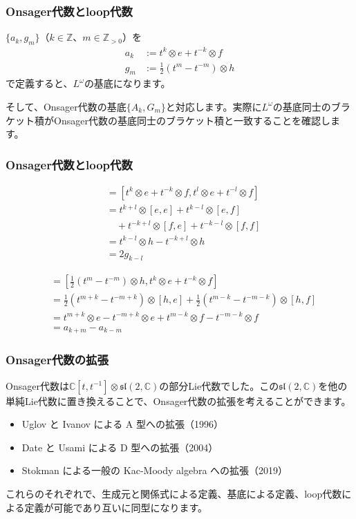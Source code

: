 \documentclass{beamer}
\begin{document}
\begin{frame}
    \frametitle{Onsager代数とloop代数}

    $\{a_k,g_m\}$（$k∈ℤ$、$m∈ℤ_{>0}$）を
    \begin{align}
        a_k & :=t^k⊗e+t^{-k}⊗f            \\
        g_m & :=\frac{1}{2}(t^m-t^{-m})⊗h
    \end{align}
    で定義すると、$L^ω$の基底になります。

    \bigskip

    そして、Onsager代数の基底$\{A_k,G_m\}$と対応します。実際に$L^ω$の基底同士のブラケット積がOnsager代数の基底同士のブラケット積と一致することを確認します。
\end{frame}

\begin{frame}
    \frametitle{Onsager代数とloop代数}

    \begin{align}
        [a_k,a_l] & = [t^k⊗e+t^{-k}⊗f,t^l⊗e+t^{-l}⊗f]    \\
                  & = t^{k+l}⊗[e,e]+t^{k-l}⊗[e,f]        \\
                  & \quad +t^{-k+l}⊗[f,e]+t^{-k-l}⊗[f,f] \\
                  & = t^{k-l}⊗h-t^{-k+l}⊗h               \\
                  & = 2g_{k-l}
    \end{align}

    \begin{align}
        [g_m,a_k] & = \left[\frac{1}{2}(t^m-t^{-m})⊗h,t^k⊗e+t^{-k}⊗f\right]                   \\
                  & = \frac{1}{2}(t^{m+k}-t^{-m+k})⊗[h,e]+\frac{1}{2}(t^{m-k}-t^{-m-k})⊗[h,f] \\
                  & = t^{m+k}⊗e-t^{-m+k}⊗e+t^{m-k}⊗f-t^{-m-k}⊗f                               \\
                  & = a_{k+m}-a_{k-m}
    \end{align}
\end{frame}

\begin{frame}
    \frametitle{Onsager代数の拡張}

    Onsager代数は$ℂ[t,t^{-1}]⊗\mathfrak{sl}(2,ℂ)$の部分Lie代数でした。この$\mathfrak{sl}(2,ℂ)$を他の単純Lie代数に置き換えることで、Onsager代数の拡張を考えることができます。

    \bigskip

    \begin{itemize}
        \item Uglov と Ivanov による A 型への拡張（1996）
        \item Date と Usami による D 型への拡張（2004）
        \item Stokman による一般の Kac-Moody algebra への拡張（2019）
    \end{itemize}

    \bigskip

    これらのそれぞれで、生成元と関係式による定義、基底による定義、loop代数による定義が可能であり互いに同型になります。
\end{frame}
\end{document}
